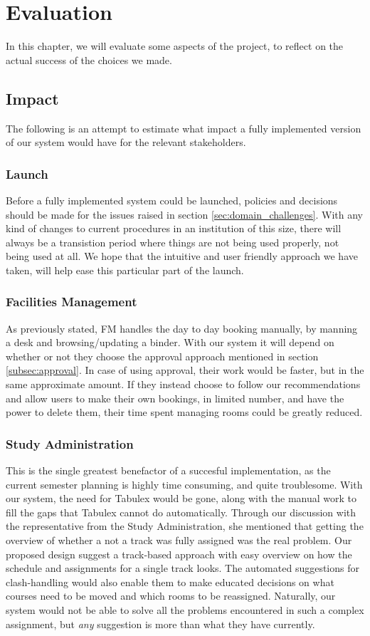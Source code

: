 \chapter{Evaluation}
\label{chap:evaluation}
In this chapter, we will evaluate some aspects of the project, to reflect on the actual success of the choices we made.

\section{Impact}
\label{sec:impact}
The following is an attempt to estimate what impact a fully implemented version of our system would have for the relevant stakeholders.

\subsection{Launch}
Before a fully implemented system could be launched, policies and decisions should be made for the issues raised in section \ref{sec:domain_challenges}.
With any kind of changes to current procedures in an institution of this size, there will always be a transistion period where things are not being used properly, not being used at all. We hope that the intuitive and user friendly approach we have taken, will help ease this particular part of the launch.

\subsection{Facilities Management}
As previously stated, FM handles the day to day booking manually, by manning a desk and browsing/updating a binder.
With our system it will depend on whether or not they choose the approval approach mentioned in section \ref{subsec:approval}.
In case of using approval, their work would be faster, but in the same approximate amount.
If they instead choose to follow our recommendations and allow users to make their own bookings, in limited number, and have the power to delete them, their time spent managing rooms could be greatly reduced.

\subsection{Study Administration}
This is the single greatest benefactor of a succesful implementation, as the current semester planning is highly time consuming, and quite troublesome. With our system, the need for Tabulex would be gone, along with the manual work to fill the gaps that Tabulex cannot do automatically. Through our discussion with the representative from the Study Administration, she mentioned that getting the overview of whether a not a track was fully assigned was the real problem. Our proposed design suggest a track-based approach with easy overview on how the schedule and assignments for a single track looks. The automated suggestions for clash-handling would also enable them to make educated decisions on what courses need to be moved and which rooms to be reassigned. Naturally, our system would not be able to solve all the problems encountered in such a complex assignment, but \emph{any} suggestion is more than what they have currently.

